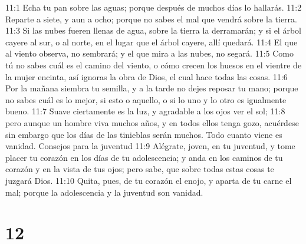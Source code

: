 11:1 Echa tu pan sobre las aguas; porque después de muchos días lo hallarás.  
11:2 Reparte a siete, y aun a ocho; porque no sabes el mal que vendrá sobre la tierra.  
11:3 Si las nubes fueren llenas de agua, sobre la tierra la derramarán; y si el árbol cayere al sur, o al norte, en el lugar que el árbol cayere, allí quedará.  
11:4 El que al viento observa, no sembrará; y el que mira a las nubes, no segará.  
11:5 Como tú no sabes cuál es el camino del viento, o cómo crecen los huesos en el vientre de la mujer encinta, así ignoras la obra de Dios, el cual hace todas las cosas.  
11:6 Por la mañana siembra tu semilla, y a la tarde no dejes reposar tu mano; porque no sabes cuál es lo mejor, si esto o aquello, o si lo uno y lo otro es igualmente bueno.  
11:7 Suave ciertamente es la luz, y agradable a los ojos ver el sol;  
11:8 pero aunque un hombre viva muchos años, y en todos ellos tenga gozo, acuérdese sin embargo que los días de las tinieblas serán muchos. Todo cuanto viene es vanidad.  
Consejos para la juventud  
11:9 Alégrate, joven, en tu juventud, y tome placer tu corazón en los días de tu adolescencia; y anda en los caminos de tu corazón y en la vista de tus ojos; pero sabe, que sobre todas estas cosas te juzgará Dios.  
11:10 Quita, pues, de tu corazón el enojo, y aparta de tu carne el mal; porque la adolescencia y la juventud son vanidad.  

\chapter{12}



